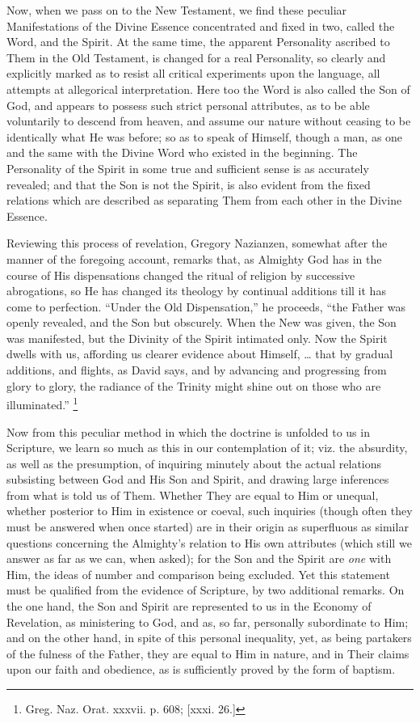 Now, when we pass on to the New Testament, we find these peculiar
Manifestations of the Divine Essence concentrated and fixed in two,
called the Word, and the Spirit. At the same time, the apparent
Personality ascribed to Them in the Old Testament, is changed for a
real Personality, so clearly and explicitly marked as to resist all
critical experiments upon the language, all attempts at allegorical
interpretation. Here too the Word is also called the Son of God, and
appears to possess such strict personal attributes, as to be able
voluntarily to descend from heaven, and assume our nature without
ceasing to be identically what He was before; so as to speak of
Himself, though a man, as one and the same with the Divine Word who
existed in the beginning. The Personality of the Spirit in some true
and sufficient sense is as accurately revealed; and that the Son is
not the Spirit, is also evident from the fixed relations which are
described as separating Them from each other in the Divine Essence.

Reviewing this process of revelation, Gregory Nazianzen, somewhat
after the manner of the foregoing account, remarks that, as Almighty
God has in the course of His dispensations changed the ritual of
religion by successive abrogations, so He has changed its theology by
continual additions till it has come to perfection. ``Under the
Old Dispensation,'' he proceeds, ``the Father was openly
revealed, and the Son but obscurely. When the New was given, the Son
was manifested, but the Divinity of the Spirit intimated only. Now the
Spirit dwells with us, affording us clearer evidence about Himself,
… that by gradual additions, and flights, as David says, and by
advancing and progressing from glory to glory, the radiance of the
Trinity might shine out on those who are illuminated.'' \footnote{Greg. Naz. Orat. xxxvii. p. 608; [xxxi. 26.]}

Now from this peculiar method in which the doctrine is unfolded to
us in Scripture, we learn so much as this in our contemplation of it;
viz. the absurdity, as well as the presumption, of inquiring minutely
about the actual relations subsisting between God and His Son and
Spirit, and drawing large inferences from what is told us of Them.
Whether They are equal to Him or unequal, whether posterior to Him in
existence or coeval, such inquiries (though often they must be
answered when once started) are in their origin as superfluous as
similar questions concerning the Almighty's relation to His own
attributes (which still we answer as far as we can, when asked); for
the Son and the Spirit are \emph{one} with Him, the ideas of number
and comparison being excluded. Yet this statement must be qualified
from the evidence of Scripture, by two additional remarks. On the one
hand, the Son and Spirit are represented to us in the Economy of
Revelation, as ministering to God, and as, so far, personally
subordinate to Him; and on the other hand, in spite of this personal
inequality, yet, as being partakers of the fulness of the Father, they
are equal to Him in nature, and in Their claims upon our faith and
obedience, as is sufficiently proved by the form of baptism.

